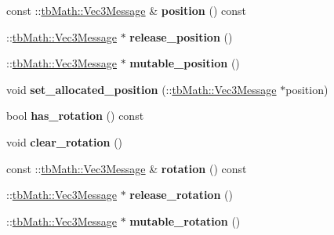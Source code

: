 \begin{DoxyCompactItemize}
const \+::\hyperlink{classtbMath_1_1Vec3Message}{tb\+Math\+::\+Vec3\+Message} \& {\bfseries position} () const
\item 
\mbox{\label{classtbBasics_1_1CreateActorBody_a382eb67755e7e1933839f16ef3cb7c7d}} 
\+::\hyperlink{classtbMath_1_1Vec3Message}{tb\+Math\+::\+Vec3\+Message} $\ast$ {\bfseries release\+\_\+position} ()
\item 
\mbox{\label{classtbBasics_1_1CreateActorBody_af6d03301d80982c5768dc5bf50ffb42c}} 
\+::\hyperlink{classtbMath_1_1Vec3Message}{tb\+Math\+::\+Vec3\+Message} $\ast$ {\bfseries mutable\+\_\+position} ()
\item 
\mbox{\label{classtbBasics_1_1CreateActorBody_ab2da59e15e052d5780cef32236f490cc}} 
void {\bfseries set\+\_\+allocated\+\_\+position} (\+::\hyperlink{classtbMath_1_1Vec3Message}{tb\+Math\+::\+Vec3\+Message} $\ast$position)
\item 
\mbox{\label{classtbBasics_1_1CreateActorBody_af641ca8adc9f36012ce959eb2fe5f0cb}} 
bool {\bfseries has\+\_\+rotation} () const
\item 
\mbox{\label{classtbBasics_1_1CreateActorBody_a9f67821ce923e170162170b1b32a13c0}} 
void {\bfseries clear\+\_\+rotation} ()
\item 
\mbox{\label{classtbBasics_1_1CreateActorBody_a79b340a92840745295e0594640f55adf}} 
const \+::\hyperlink{classtbMath_1_1Vec3Message}{tb\+Math\+::\+Vec3\+Message} \& {\bfseries rotation} () const
\item 
\mbox{\label{classtbBasics_1_1CreateActorBody_a242112203d60b47b8e4a15d4f53c780b}} 
\+::\hyperlink{classtbMath_1_1Vec3Message}{tb\+Math\+::\+Vec3\+Message} $\ast$ {\bfseries release\+\_\+rotation} ()
\item 
\mbox{\label{classtbBasics_1_1CreateActorBody_aaf91be63b5bfeb63626fe1eddaeae343}} 
\+::\hyperlink{classtbMath_1_1Vec3Message}{tb\+Math\+::\+Vec3\+Message} $\ast$ {\bfseries mutable\+\_\+rotation} ()
\item 

\end{DoxyCompactItemize}
